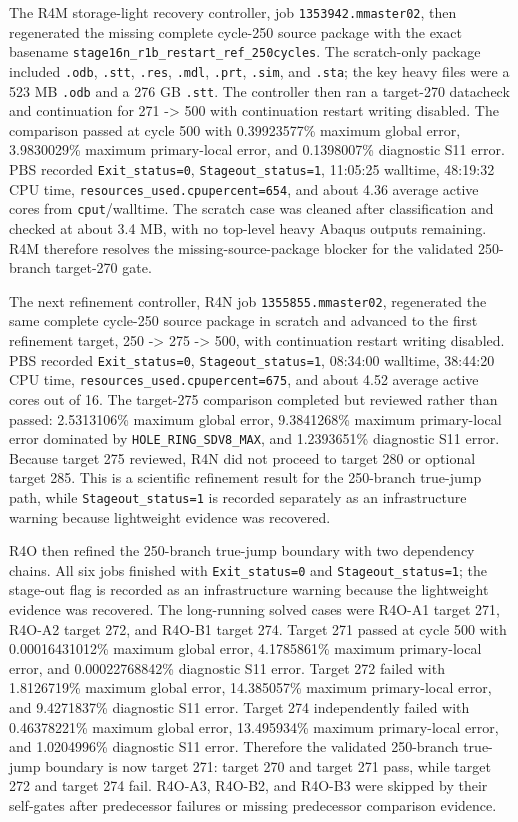 \documentclass[11pt,a4paper]{article}
\newcommand{\code}[1]{\texttt{#1}}
\begin{document}
The R4M storage-light recovery controller, job \code{1353942.mmaster02}, then regenerated the missing complete cycle-250 source package with the exact basename \code{stage16n\_r1b\_restart\_ref\_250cycles}. The scratch-only package included \code{.odb}, \code{.stt}, \code{.res}, \code{.mdl}, \code{.prt}, \code{.sim}, and \code{.sta}; the key heavy files were a 523 MB \code{.odb} and a 276 GB \code{.stt}. The controller then ran a target-270 datacheck and continuation for 271 -> 500 with continuation restart writing disabled. The comparison passed at cycle 500 with 0.39923577\% maximum global error, 3.9830029\% maximum primary-local error, and 0.1398007\% diagnostic S11 error. PBS recorded \code{Exit\_status=0}, \code{Stageout\_status=1}, 11:05:25 walltime, 48:19:32 CPU time, \code{resources\_used.cpupercent=654}, and about 4.36 average active cores from \code{cput}/walltime. The scratch case was cleaned after classification and checked at about 3.4 MB, with no top-level heavy Abaqus outputs remaining. R4M therefore resolves the missing-source-package blocker for the validated 250-branch target-270 gate.

The next refinement controller, R4N job \code{1355855.mmaster02}, regenerated the same complete cycle-250 source package in scratch and advanced to the first refinement target, 250 -> 275 -> 500, with continuation restart writing disabled. PBS recorded \code{Exit\_status=0}, \code{Stageout\_status=1}, 08:34:00 walltime, 38:44:20 CPU time, \code{resources\_used.cpupercent=675}, and about 4.52 average active cores out of 16. The target-275 comparison completed but reviewed rather than passed: 2.5313106\% maximum global error, 9.3841268\% maximum primary-local error dominated by \code{HOLE\_RING\_SDV8\_MAX}, and 1.2393651\% diagnostic S11 error. Because target 275 reviewed, R4N did not proceed to target 280 or optional target 285. This is a scientific refinement result for the 250-branch true-jump path, while \code{Stageout\_status=1} is recorded separately as an infrastructure warning because lightweight evidence was recovered.

R4O then refined the 250-branch true-jump boundary with two dependency chains. All six jobs finished with \code{Exit\_status=0} and \code{Stageout\_status=1}; the stage-out flag is recorded as an infrastructure warning because the lightweight evidence was recovered. The long-running solved cases were R4O-A1 target 271, R4O-A2 target 272, and R4O-B1 target 274. Target 271 passed at cycle 500 with 0.00016431012\% maximum global error, 4.1785861\% maximum primary-local error, and 0.00022768842\% diagnostic S11 error. Target 272 failed with 1.8126719\% maximum global error, 14.385057\% maximum primary-local error, and 9.4271837\% diagnostic S11 error. Target 274 independently failed with 0.46378221\% maximum global error, 13.495934\% maximum primary-local error, and 1.0204996\% diagnostic S11 error. Therefore the validated 250-branch true-jump boundary is now target 271: target 270 and target 271 pass, while target 272 and target 274 fail. R4O-A3, R4O-B2, and R4O-B3 were skipped by their self-gates after predecessor failures or missing predecessor comparison evidence.
\end{document}
